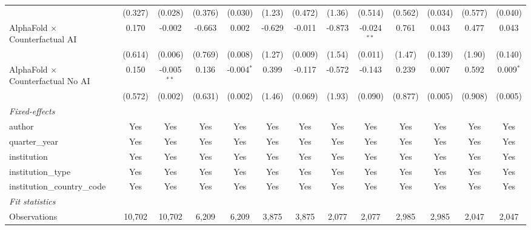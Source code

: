 \begin{tabular}{lcccccccccccc}
                                            & (0.327) & (0.028)       & (0.376) & (0.030)      & (1.23)     & (0.472) & (1.36)  & (0.514)       & (0.562)     & (0.034)       & (0.577) & (0.040)\\   
   AlphaFold $\times$ Counterfactual AI     & 0.170   & -0.002        & -0.663  & 0.002        & -0.629     & -0.011  & -0.873  & -0.024$^{**}$ & 0.761       & 0.043         & 0.477   & 0.043\\   
                                            & (0.614) & (0.006)       & (0.769) & (0.008)      & (1.27)     & (0.009) & (1.54)  & (0.011)       & (1.47)      & (0.139)       & (1.90)  & (0.140)\\   
   AlphaFold $\times$ Counterfactual No AI  & 0.150   & -0.005$^{**}$ & 0.136   & -0.004$^{*}$ & 0.399      & -0.117  & -0.572  & -0.143        & 0.239       & 0.007         & 0.592   & 0.009$^{*}$\\   
                                            & (0.572) & (0.002)       & (0.631) & (0.002)      & (1.46)     & (0.069) & (1.93)  & (0.090)       & (0.877)     & (0.005)       & (0.908) & (0.005)\\   
   \midrule
   \emph{Fixed-effects}\\
   author                                   & Yes     & Yes           & Yes     & Yes          & Yes        & Yes     & Yes     & Yes           & Yes         & Yes           & Yes     & Yes\\  
   quarter\_year                            & Yes     & Yes           & Yes     & Yes          & Yes        & Yes     & Yes     & Yes           & Yes         & Yes           & Yes     & Yes\\  
   institution                              & Yes     & Yes           & Yes     & Yes          & Yes        & Yes     & Yes     & Yes           & Yes         & Yes           & Yes     & Yes\\  
   institution\_type                        & Yes     & Yes           & Yes     & Yes          & Yes        & Yes     & Yes     & Yes           & Yes         & Yes           & Yes     & Yes\\  
   institution\_country\_code               & Yes     & Yes           & Yes     & Yes          & Yes        & Yes     & Yes     & Yes           & Yes         & Yes           & Yes     & Yes\\  
   \midrule
   \emph{Fit statistics}\\
   Observations                             & 10,702  & 10,702        & 6,209   & 6,209        & 3,875      & 3,875   & 2,077   & 2,077         & 2,985       & 2,985         & 2,047   & 2,047\\  

\end{tabular}
